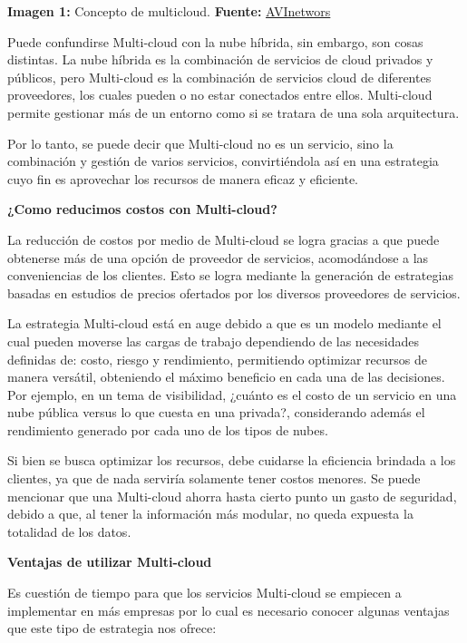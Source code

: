 \documentclass[12pt,spanish,Letterpaper,openany]{book}
\begin{document}


\textbf{Imagen 1:} Concepto de multicloud. \textbf{Fuente:} \href{https://avinetworks.com/}{AVInetwors}



Puede confundirse Multi-cloud con la nube híbrida, sin embargo, son cosas distintas. La nube híbrida es la combinación de servicios de cloud privados y públicos, pero Multi-cloud es la combinación de servicios cloud de diferentes proveedores, los cuales pueden o no estar conectados entre ellos. Multi-cloud permite gestionar más de un entorno como si se tratara de una sola arquitectura.

Por lo tanto, se puede decir que Multi-cloud no es un servicio, sino la combinación y gestión de varios servicios, convirtiéndola así en una estrategia cuyo fin es aprovechar los recursos de manera eficaz y eficiente.

\textbf{¿Como reducimos costos con Multi-cloud?}

La reducción de costos por medio de Multi-cloud se logra gracias a que puede obtenerse más de una opción de proveedor de servicios, acomodándose a las conveniencias de los clientes. Esto se logra mediante la generación de estrategias basadas en estudios de precios ofertados por los diversos proveedores de servicios.

La estrategia Multi-cloud está en auge debido a que es un modelo mediante el cual pueden moverse las cargas de trabajo dependiendo de las necesidades definidas de: costo, riesgo y rendimiento, permitiendo optimizar recursos de manera versátil, obteniendo el máximo beneficio en cada una de las decisiones. Por ejemplo, en un tema de visibilidad, ¿cuánto es el costo de un servicio en una nube pública versus lo que cuesta en una privada?, considerando además el rendimiento generado por cada uno de los tipos de nubes.

Si bien se busca optimizar los recursos, debe cuidarse la eficiencia brindada a los clientes, ya que de nada serviría solamente tener costos menores. Se puede mencionar que una Multi-cloud ahorra hasta cierto punto un gasto de seguridad, debido a que, al tener la información más modular, no queda expuesta la totalidad de los datos.

\textbf{Ventajas de utilizar Multi-cloud}

Es cuestión de tiempo para que los servicios Multi-cloud se empiecen a implementar en más empresas por lo cual es necesario conocer algunas ventajas que este tipo de estrategia nos ofrece:
\end{document}

